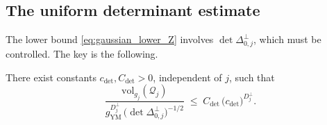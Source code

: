 \subsection{The uniform determinant estimate}
\label{ssec:app231_uniform}

The lower bound \eqref{eq:gaussian_lower_Z} involves
$\det\Delta_{0,j}^{\perp}$, which must be controlled. The key is the
following.

\begin{lemma}
\label{lem:det_vol_ratio}
There exist constants $c_{\mathrm{det}},C_{\mathrm{det}}>0$,
independent of $j$, such that
\begin{equation}
\label{eq:det_vol_ratio}
  \frac{\mathrm{vol}_{g_{j}}(\mathcal{Q}_{j})}{
  g_{\mathrm{YM}}^{D_{j}^{\perp}}\,
  \bigl(\det\Delta_{0,j}^{\perp}\bigr)^{-1/2}}
  \;\le\;C_{\mathrm{det}}\,\bigl(c_{\mathrm{det}}\bigr)^{D_{j}^{
  \perp}}.
\end{equation}
\end{lemma}

